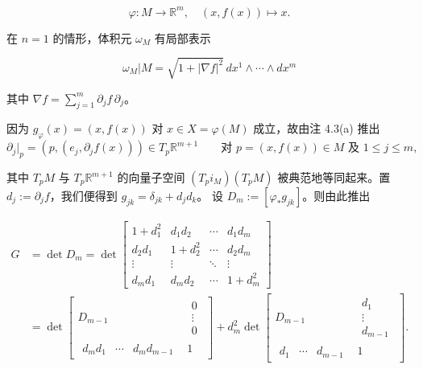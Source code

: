 \begin{example}
\begin{items}
\[
\varphi : M \to \mathbb{R}^m , \quad (x, f(x)) \mapsto x .
\]

在 $ n = 1 $ 的情形，体积元 $ \omega_M $ 有局部表示

\[
\omega_M|M = \sqrt{1 + |\nabla f|^2}\, dx^1 \wedge \cdots \wedge dx^m
\]

其中 $ \nabla f = \sum_{j=1}^{m} \partial_j f\, \partial_j $。

\proofhead
因为 $ g_\varphi(x) = (x, f(x)) $ 对 $ x \in X = \varphi(M) $ 成立，故由注 4.3(a) 推出
\[
\partial_j|_p = (p, (e_j, \partial_j f(x))) \in T_p\mathbb{R}^{m+1} \qquad \text{对 } p = (x, f(x)) \in M \text{ 及 } 1 \le j \le m ,
\]

其中 $ T_p M $ 与 $ T_p\mathbb{R}^{m+1} $ 的向量子空间 $ (T_p i_M)(T_p M) $ 被典范地等同起来。置 $ d_j := \partial_j f $，我们便得到 $ g_{jk} = \delta_{jk} + d_j d_k $。
设 $ D_m := [\varphi_{*}g_{jk}] $。则由此推出

\begin{equation*}
\begin{aligned}
G &= \det D_m = \det\begin{bmatrix} 1+d_1^2 & d_1 d_2 & \cdots & d_1 d_m \\ d_2 d_1 & 1+d_2^2 & \cdots & d_2 d_m \\ \vdots & \vdots & \ddots & \vdots \\ d_m d_1 & d_m d_2 & \cdots & 1+d_m^2 \end{bmatrix} \\ &= \det\begin{bmatrix} D_{m-1} & \begin{matrix} 0 \\ \vdots \\ 0 \end{matrix} \\ \begin{matrix} d_m d_1 & \cdots & d_m d_{m-1} \end{matrix} & 1 \end{bmatrix} + d_m^2 \det\begin{bmatrix} D_{m-1} & \begin{matrix} d_1 \\ \vdots \\ d_{m-1} \end{matrix} \\ \begin{matrix} d_1 & \cdots & d_{m-1} \end{matrix} & 1 \end{bmatrix} .
\end{aligned}
\end{equation*}


\end{items}
\end{example}
